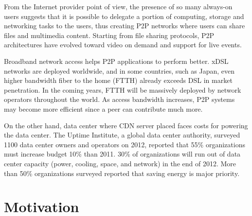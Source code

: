 \documentclass[JIP]{ipsj}
\begin{document}
From the Internet provider point of view, the presence of so many always-on users suggests that it is possible to delegate a portion of computing, storage and networking tasks to the users, thus creating P2P networks where users can share files and multimedia content.
Starting from file sharing protocols, P2P architectures have evolved toward video on demand and support for live events.

Broadband network access helps P2P applications to perform better.
xDSL networks are deployed worldwide, and in some countries, such as Japan, even higher bandwidth fiber to the home (FTTH) already exceeds DSL in market penetration.  In the coming years, FTTH will be massively deployed by network operators throughout the world.  
As access bandwidth increases, P2P systems may become more efficient since a peer can contribute much more.

On the other hand, data center where CDN server placed faces costs for powering the data center.
The Uptime Institute, a global data center authority, surveyed 1100 data center owners and operators on 2012, reported that 55\% organizations must increase budget 10\% than 2011.  
30\% of organizations will run out of data center capacity (power, cooling, space, and network) in the end of 2012. 
More than 50\% organizations surveyed reported that saving energy is major priority.




\section{Motivation}\label{motivation}
\end{document}
